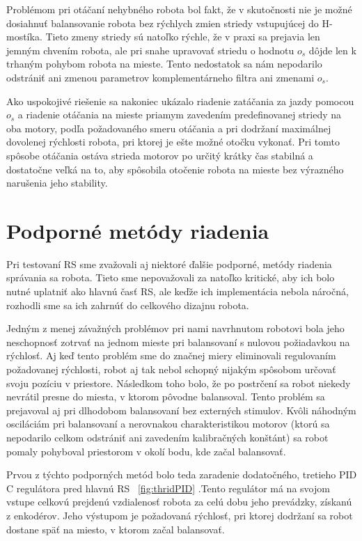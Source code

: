Problémom pri otáčaní nehybného robota bol fakt, že v skutočnosti nie je možné dosiahnuť balansovanie robota bez rýchlych zmien striedy vstupujúcej do H-mostíka. Tieto zmeny striedy sú natoľko rýchle, že v praxi sa prejavia len jemným chvením robota, ale pri snahe upravovať striedu o hodnotu $o_s$ dôjde len k trhaným pohybom robota na mieste. Tento nedostatok sa nám nepodarilo odstrániť ani zmenou parametrov komplementárneho filtra ani zmenami $o_s$.

Ako uspokojivé riešenie sa nakoniec ukázalo riadenie zatáčania za jazdy pomocou $o_s$ a riadenie otáčania na mieste priamym zavedením predefinovanej striedy na oba motory, podľa požadovaného smeru otáčania a pri dodržaní maximálnej dovolenej rýchlosti robota, pri ktorej je ešte možné otočku vykonať. Pri tomto spôsobe otáčania ostáva strieda motorov po určitý krátky čas stabilná a dostatočne veľká na to, aby spôsobila otočenie robota na mieste bez výrazného narušenia jeho stability. 

\section{Podporné metódy riadenia}
Pri testovaní RS sme zvažovali aj niektoré ďalšie podporné, metódy riadenia správania sa robota. Tieto sme nepovažovali za natoľko kritické, aby ich bolo nutné uplatniť ako hlavnú časť \ac{RS}, ale keďže ich implementácia nebola náročná, rozhodli sme sa ich zahrnúť do celkového dizajnu robota.

Jedným z menej závažných problémov pri nami navrhnutom robotovi bola jeho neschopnosť zotrvať na jednom mieste pri balansovaní s nulovou požiadavkou na rýchlosť. Aj keď tento problém sme do značnej miery eliminovali regulovaním požadovanej rýchlosti, robot aj tak nebol schopný nijakým spôsobom určovať svoju pozíciu v priestore. Následkom toho bolo, že po postrčení sa robot niekedy nevrátil presne do miesta, v ktorom pôvodne balansoval. Tento problém sa prejavoval aj pri dlhodobom balansovaní bez externých stimulov. Kvôli náhodným osciláciám pri balansovaní a nerovnakou charakteristikou motorov (ktorú sa nepodarilo celkom odstrániť ani zavedením kalibračných konštánt) sa robot pomaly pohyboval priestorom v okolí bodu, kde začal balansovať.  

Prvou z týchto podporných metód bolo teda zaradenie dodatočného, tretieho PID C regulátora pred hlavnú RS \figurename~\ref{fig:thridPID} .Tento regulátor má na svojom vstupe celkovú prejdenú vzdialenosť robota za celú dobu jeho prevádzky, získanú z enkodérov. Jeho výstupom je požadovaná rýchlosť, pri ktorej dodržaní sa robot dostane späť na miesto, v ktorom začal balansovať. 

